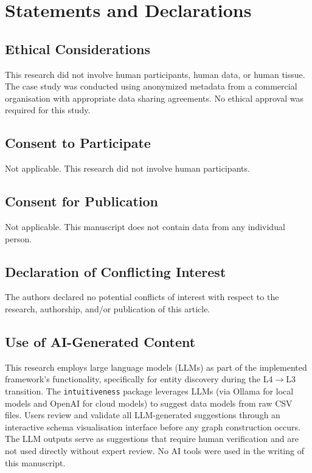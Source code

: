 \documentclass[12pt,a4paper]{article}
\begin{document}
\section*{Statements and Declarations}

\subsection*{Ethical Considerations}
This research did not involve human participants, human data, or human tissue. The case study was conducted using anonymized metadata from a commercial organisation with appropriate data sharing agreements. No ethical approval was required for this study.

\subsection*{Consent to Participate}
Not applicable. This research did not involve human participants.

\subsection*{Consent for Publication}
Not applicable. This manuscript does not contain data from any individual person.

\subsection*{Declaration of Conflicting Interest}
The authors declared no potential conflicts of interest with respect to the research, authorship, and/or publication of this article.

\subsection*{Use of AI-Generated Content}
This research employs large language models (LLMs) as part of the implemented framework's functionality, specifically for entity discovery during the L4$\to$L3 transition. The \texttt{intuitiveness} package leverages LLMs (via Ollama for local models and OpenAI for cloud models) to suggest data models from raw CSV files. Users review and validate all LLM-generated suggestions through an interactive schema visualisation interface before any graph construction occurs. The LLM outputs serve as suggestions that require human verification and are not used directly without expert review. No AI tools were used in the writing of this manuscript.
\end{document}
